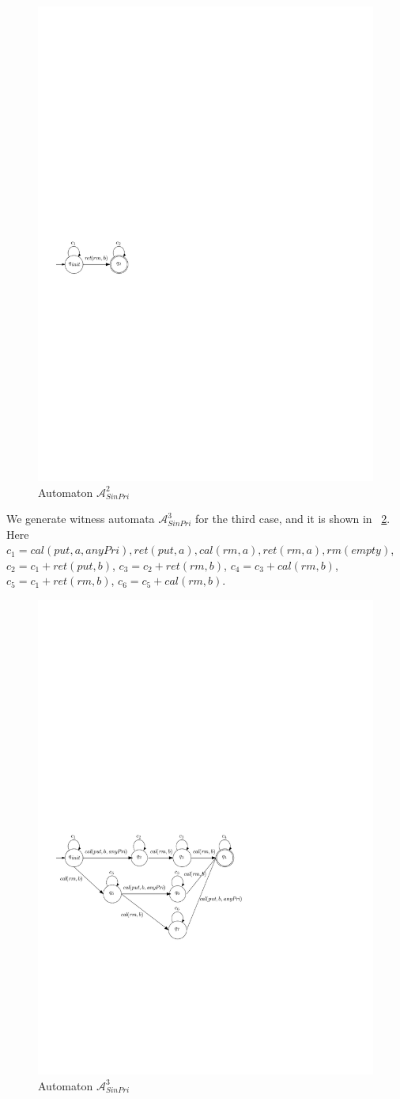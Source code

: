 \begin{figure}[htbp]
  \centering
  \includegraphics[width=0.3 \textwidth]{figures/PIC_AUTO_FIFO_2.pdf}
  \caption{Automaton $\mathcal{A}_{\textit{SinPri}}^2$}
  \label{fig:automata for FIFO-2}
\end{figure}

We generate witness automata $\mathcal{A}_{\textit{SinPri}}^3$ for the third case, and it is shown in \figurename~\ref{fig:automata for FIFO-3}. Here $c_1 = \textit{cal}(\textit{put},a,\textit{anyPri}),\textit{ret}(\textit{put},a), \textit{cal}(\textit{rm},a),\textit{ret}(\textit{rm},a),\textit{rm}(\textit{empty})$, $c_2 = c_1 + \textit{ret}(\textit{put},b)$, $c_3 = c_2 + \textit{ret}(\textit{rm},b)$, $c_4 = c_3 + \textit{cal}(\textit{rm},b)$, $c_5 = c_1 + \textit{ret}(\textit{rm},b)$, $c_6 = c_5 + \textit{cal}(\textit{rm},b)$.

\begin{figure}[htbp]
  \centering
  \includegraphics[width=0.7 \textwidth]{figures/PIC_AUTO_FIFO_3.pdf}
  \caption{Automaton $\mathcal{A}_{\textit{SinPri}}^3$}
  \label{fig:automata for FIFO-3}
\end{figure}

